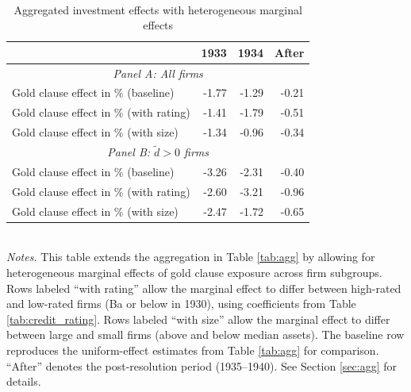 \begin{table}[p]\centering
    \caption{\\Aggregated investment effects with heterogeneous marginal effects}\footnotesize
    \label{tabapp:agg_het}
    \begin{tabular}{lrrr}
    \toprule
    & 1933 & 1934 & After \\
    \midrule
    \multicolumn{4}{c}{\textit{Panel A: All firms}}\\
    \midrule
    Gold clause effect in \% (baseline)      & -1.77 & -1.29 & -0.21 \\
    Gold clause effect in \% (with rating)      & -1.41 & -1.79 & -0.51 \\
    Gold clause effect in \% (with size)      & -1.34 & -0.96 & -0.34 \\
    \midrule
    \multicolumn{4}{c}{\textit{Panel B: $\tilde{d}>0$ firms}}\\
    \midrule
    Gold clause effect in \% (baseline)      & -3.26 & -2.31 & -0.40 \\
    Gold clause effect in \% (with rating)      & -2.60 & -3.21 & -0.96 \\
    Gold clause effect in \% (with size)      & -2.47 & -1.72 & -0.65 \\
    \bottomrule

    \end{tabular}\\

    \vspace*{3mm} \justifying \noindent
\footnotesize{\textit{Notes.} This table extends the aggregation in Table \ref{tab:agg} by allowing for heterogeneous marginal effects of gold clause exposure across firm subgroups. Rows labeled ``with rating'' allow the marginal effect to differ between high-rated and low-rated firms (Ba or below in 1930), using coefficients from Table \ref{tab:credit_rating}. Rows labeled ``with size'' allow the marginal effect to differ between large and small firms (above and below median assets). The baseline row reproduces the uniform-effect estimates from Table \ref{tab:agg} for comparison. ``After'' denotes the post-resolution period (1935--1940). See Section \ref{sec:agg} for details.}
\end{table}